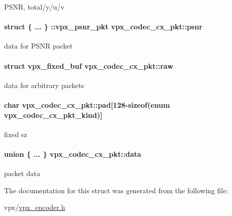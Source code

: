 \-P\-S\-N\-R, total/y/u/v \hypertarget{structvpx__codec__cx__pkt_ac91dc0ee23d3d939b85eb82eb5ccc042}{
\paragraph[{psnr}]{\setlength{\rightskip}{0pt plus 5cm}struct \{ ... \} \-::vpx\-\_\-psnr\-\_\-pkt  {\bf vpx\-\_\-codec\-\_\-cx\-\_\-pkt\-::psnr}}}
\label{structvpx__codec__cx__pkt_ac91dc0ee23d3d939b85eb82eb5ccc042}
data for \-P\-S\-N\-R packet \hypertarget{structvpx__codec__cx__pkt_acc7ee91ea9c907aea7c3b953324f7c26}{
\paragraph[{raw}]{\setlength{\rightskip}{0pt plus 5cm}struct {\bf vpx\-\_\-fixed\-\_\-buf} {\bf vpx\-\_\-codec\-\_\-cx\-\_\-pkt\-::raw}}}
\label{structvpx__codec__cx__pkt_acc7ee91ea9c907aea7c3b953324f7c26}
data for arbitrary packets \hypertarget{structvpx__codec__cx__pkt_a49a0ba012fdabd49bff8069dfacf6ced}{
\paragraph[{pad}]{\setlength{\rightskip}{0pt plus 5cm}char {\bf vpx\-\_\-codec\-\_\-cx\-\_\-pkt\-::pad}\mbox{[}128-\/sizeof(enum {\bf vpx\-\_\-codec\-\_\-cx\-\_\-pkt\-\_\-kind})\mbox{]}}}
\label{structvpx__codec__cx__pkt_a49a0ba012fdabd49bff8069dfacf6ced}
fixed sz \hypertarget{structvpx__codec__cx__pkt_a7f97b060a23b7e89fe5b885c0074f696}{
\paragraph[{data}]{\setlength{\rightskip}{0pt plus 5cm}union \{ ... \}   {\bf vpx\-\_\-codec\-\_\-cx\-\_\-pkt\-::data}}}
\label{structvpx__codec__cx__pkt_a7f97b060a23b7e89fe5b885c0074f696}
packet data 

\-The documentation for this struct was generated from the following file\-:\begin{DoxyCompactItemize}
\item 
vpx/\hyperlink{vpx__encoder_8h}{vpx\-\_\-encoder.\-h}\end{DoxyCompactItemize}
